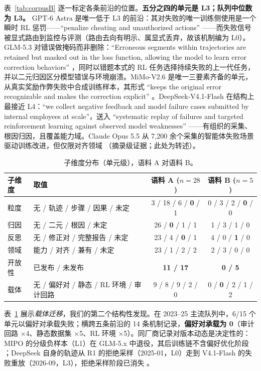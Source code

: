 \documentclass[10pt,fontset=fandol]{ctexart}
\begin{document}
表~\ref{tab:corpusB} 逐一标定各条前沿的位置。\textbf{五分之四的单元是 L3；队列中位数为 L3。} GPT-6 Astra 是唯一低于 L3 的前沿：其对失败的唯一训练侧使用是一个瞬时 RL 惩罚——``penalize cheating and unauthorized actions'' \cite{openai2026gpt6}——而失败信号被显式路由到监控与评测（路由去向有明示、属显式丢弃，故该机制编为 L0）。GLM-5.3 对错误做掩码而非删除：``Erroneous segments within trajectories are retained but masked out in the loss function, allowing the model to learn error correction behaviors'' \cite{zai2026glm5}，同时以错题本式的 RL 任务选择持续失败的上一代任务，并以二元归因区分模型错误与环境崩溃。MiMo-V2.6 是唯一三要素齐备的单元，从真实奖励作弊失败中合成训练样本，其形式 ``keeps the original error recognizable and makes the correction explicit'' \cite{xiaomi2026mimo}。DeepSeek-V4.1-Flash 在结构上最接近 L4：``we collect negative feedback and model failure cases submitted by internal employees at scale''，送入 ``systematic replay of failures and targeted reinforcement learning against observed model weaknesses'' \cite{deepseek2026v41}——有组织的采集、根因归因，且覆盖能力域。Claude Opus 5.5 从 7,200 余个采集的智能体失败场景驱动训练改进，但仅限对齐领域 \cite{anthropic2026claude}（摘录级证据；此处为转述）。

\begin{table}[t]
\centering
\caption{子维度分布（单元级），语料 A 对语料 B。}
\label{tab:subdims}
\small
\begin{tabular}{llcc}
\toprule
子维度 & 取值 & 语料 A ($n{=}28$) & 语料 B ($n{=}5$) \\
\midrule
粒度 & 无 / 轨迹 / 步骤 / 因果 / 未定 & 3 / 18 / 6 / \textbf{0} / 1 & 0 / 3 / 2 / \textbf{0} / 0 \\
归因 & 无 / 二元 / 根因 / 未定 & 26 / \textbf{0} / 1 / 1 & 1 / 3 / 1 / 0 \\
反思 & 无 / 修正对 / 完整报告 / 未定 & 23 / 4 / \textbf{0} / 1 & 4 / 0 / \textbf{1} / 0 \\
领域 & 能力 / 对齐 / 兼有 / 未定 & 23 / 1 / 2 / 2 & 2 / 3 / 0 / 0 \\
开放性 & 已发布 / 未发布 & \textbf{11 / 17} & \textbf{0 / 5} \\
载体 & 无 / 偏好对 / 静态 / RL 环境 / 审计回路 & 9 / 8 / 9 / 2 / 0 & 0 / \textbf{0} / 2 / 1 / 2 \\
\bottomrule
\end{tabular}
\end{table}

表~\ref{tab:subdims} 展示\emph{载体迁移}，我们的第二个结构性发现。在 2023--25 主流队列中，6/15 个单元以偏好对承载失败；横跨五条前沿的 14 条机制记录，\textbf{偏好对承载为 0}（审计回路 $\times$4、静态数据集 $\times$5、RL 环境 $\times$5）。同厂商记录对版本动态是决定性的：MIPO 的分级负样本（L1）在 GLM-5.x 中退役，其后训练链不含偏好优化阶段 \cite{zai2025glm45,zai2026glm5}；DeepSeek 自身的轨迹从 R1 的拒绝采样（2025-01，L0）走到 V4.1-Flash 的失败重放（2026-09，L3），拒绝采样阶段已消失 \cite{deepseek2025r1,deepseek2026v41}。
\end{document}
